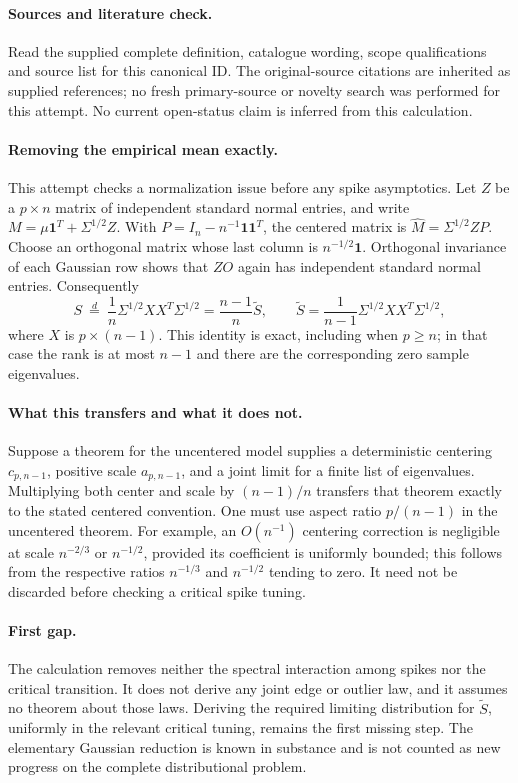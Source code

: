 \documentclass[11pt]{article}
\begin{document}
\paragraph{Sources and literature check.}
Read the supplied complete definition, catalogue wording, scope qualifications and source list for this canonical ID. The original-source citations are inherited as supplied references; no fresh primary-source or novelty search was performed for this attempt. No current open-status claim is inferred from this calculation.

\paragraph{Removing the empirical mean exactly.}This attempt checks a normalization issue before any spike asymptotics. Let \(Z\) be a \(p\times n\) matrix of independent standard normal entries, and write \(M=\mu\mathbf1^T+\Sigma^{1/2}Z\). With \(P=I_n-n^{-1}\mathbf1\mathbf1^T\), the centered matrix is \(\widehat M=\Sigma^{1/2}ZP\). Choose an orthogonal matrix whose last column is \(n^{-1/2}\mathbf1\). Orthogonal invariance of each Gaussian row shows that \(ZO\) again has independent standard normal entries. Consequently
\[ S\ \stackrel{d}=\ \frac1n\Sigma^{1/2}XX^T\Sigma^{1/2}
=\frac{n-1}{n}\widetilde S,
\qquad \widetilde S=\frac1{n-1}\Sigma^{1/2}XX^T\Sigma^{1/2},\]
where \(X\) is \(p\times(n-1)\). This identity is exact, including when \(p\ge n\); in that case the rank is at most \(n-1\) and there are the corresponding zero sample eigenvalues.
\paragraph{What this transfers and what it does not.}Suppose a theorem for the uncentered model supplies a deterministic centering \(c_{p,n-1}\), positive scale \(a_{p,n-1}\), and a joint limit for a finite list of eigenvalues. Multiplying both center and scale by \((n-1)/n\) transfers that theorem exactly to the stated centered convention. One must use aspect ratio \(p/(n-1)\) in the uncentered theorem. For example, an \(O(n^{-1})\) centering correction is negligible at scale \(n^{-2/3}\) or \(n^{-1/2}\), provided its coefficient is uniformly bounded; this follows from the respective ratios \(n^{-1/3}\) and \(n^{-1/2}\) tending to zero. It need not be discarded before checking a critical spike tuning.
\paragraph{First gap.}The calculation removes neither the spectral interaction among spikes nor the critical transition. It does not derive any joint edge or outlier law, and it assumes no theorem about those laws. Deriving the required limiting distribution for \(\widetilde S\), uniformly in the relevant critical tuning, remains the first missing step. The elementary Gaussian reduction is known in substance and is not counted as new progress on the complete distributional problem.
\end{document}
